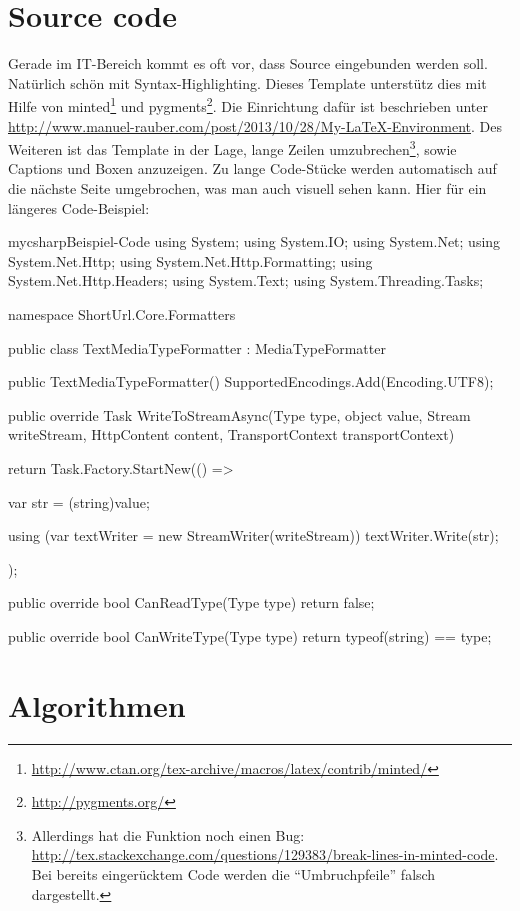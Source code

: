 \section{Source code}

Gerade im IT-Bereich kommt es oft vor, dass Source eingebunden werden soll. Natürlich schön mit Syntax-Highlighting. 
Dieses Template unterstütz dies mit Hilfe von minted\footnote{\url{http://www.ctan.org/tex-archive/macros/latex/contrib/minted/}} und pygments\footnote{\url{http://pygments.org/}}. Die Einrichtung dafür ist beschrieben unter \url{http://www.manuel-rauber.com/post/2013/10/28/My-LaTeX-Environment}.
Des Weiteren ist das Template in der Lage, lange Zeilen umzubrechen\footnote{Allerdings hat die Funktion noch einen Bug: \url{http://tex.stackexchange.com/questions/129383/break-lines-in-minted-code}. Bei bereits eingerücktem Code werden die \enquote{Umbruchpfeile} falsch dargestellt.}, sowie Captions und Boxen anzuzeigen. Zu lange Code-Stücke werden automatisch auf die nächste Seite umgebrochen, was man auch visuell sehen kann. Hier für ein längeres Code-Beispiel:

\begin{listingsbox}{mycsharp}{Beispiel-Code}
using System;
using System.IO;
using System.Net;
using System.Net.Http;
using System.Net.Http.Formatting;
using System.Net.Http.Headers;
using System.Text;
using System.Threading.Tasks;

namespace ShortUrl.Core.Formatters
{
	public class TextMediaTypeFormatter : MediaTypeFormatter
	{
		public TextMediaTypeFormatter()
		{
			SupportedEncodings.Add(Encoding.UTF8);
		}

		public override Task WriteToStreamAsync(Type type, object value, Stream writeStream, HttpContent content,
			TransportContext transportContext)
		{
			return Task.Factory.StartNew(() =>
			{

				var str = (string)value;

				using (var textWriter = new StreamWriter(writeStream))
				{
					textWriter.Write(str);
				}
			});
		}

		public override bool CanReadType(Type type)
		{
			return false;
		}

		public override bool CanWriteType(Type type)
		{
			return typeof(string) == type;
		}
	}
}
\end{listingsbox}

\section{Algorithmen}

